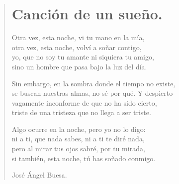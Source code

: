 \documentclass[11pt, portrait, twoside, notitlepage, openright]{book}
\begin{document}
\newpage
\begin{verse}
\begin{center}
\section{Canción de un sueño.}
\end{center}

Otra vez, esta noche, vi tu mano en la mía,\\
otra vez, esta noche, volví a soñar contigo, \\
yo, que no soy tu amante ni siquiera tu amigo, \\
sino un hombre que pasa bajo la luz del día. 
\newline

Sin embargo, en la sombra donde el tiempo no existe, \\
se buscan nuestras almas, no sé por qué. Y despierto\\
vagamente inconforme de que no ha sido cierto, \\
triste de una tristeza que no llega a ser triste.
\newline

Algo ocurre en la noche, pero yo no lo digo: \\
ni a ti, que nada sabes, ni a ti te diré nada, \\
pero al mirar tus ojos sabré, por tu mirada,\\
si también, esta noche, tú has soñado conmigo.
\newline

\begin{flushright}
José Ángel Buesa.
\end{flushright}
\end{verse}
\end{document}
